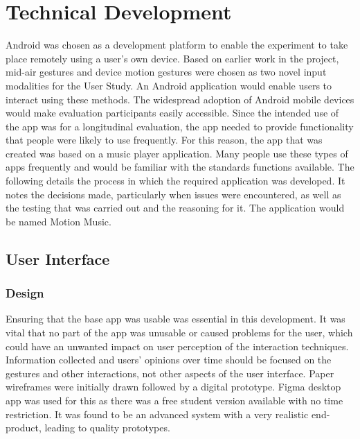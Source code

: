 \documentclass{l4proj}
\begin{document}

\chapter{Technical Development}

Android was chosen as a development platform to enable the experiment to take place remotely using a user's own device. Based on earlier work in the project, mid-air gestures and device motion gestures were chosen as two novel input modalities for the User Study. An Android application would enable users to interact using these methods. The widespread adoption of Android mobile devices would make evaluation participants easily accessible. Since the intended use of the app was for a longitudinal evaluation, the app needed to provide functionality that people were likely to use frequently. For this reason, the app that was created was based on a music player application. Many people use these types of apps frequently and would be familiar with the standards functions available. The following details the process in which the required application was developed. It notes the decisions made, particularly when issues were encountered, as well as the testing that was carried out and the reasoning for it. The application would be named Motion Music.


\section{User Interface}

\subsection{Design}
Ensuring that the base app was usable was essential in this development. It was vital that no part of the app was unusable or caused problems for the user, which could have an unwanted impact on user perception of the interaction techniques. Information collected and users’ opinions over time should be focused on the gestures and other interactions, not other aspects of the user interface. Paper wireframes were initially drawn followed by a digital prototype. Figma desktop app was used for this as there was a free student version available with no time restriction. It was found to be an advanced system with a very realistic end-product, leading to quality prototypes.
\end{document}
